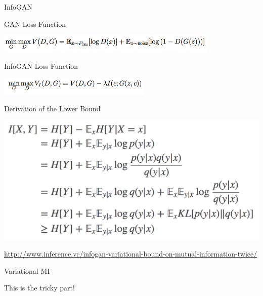\documentclass{beamer}
\begin{document}
\begin{frame}{InfoGAN}{}

GAN Loss Function

\begin{center}
    \includegraphics[width=0.8\textwidth]{gan_loss}
\end{center}

InfoGAN Loss Function

\begin{center}
    \includegraphics[width=0.55\textwidth]{infogan_loss}
\end{center}

\end{frame}

\begin{frame}{Derivation of the Lower Bound}{}

\begin{center}
    \includegraphics[height=0.6\textheight]{lowerbound}
\end{center}

  \url{http://www.inference.vc/infogan-variational-bound-on-mutual-information-twice/}

\end{frame}

\begin{frame}{Variational MI}{}

  This is the tricky part!

\end{frame}
\end{document}

